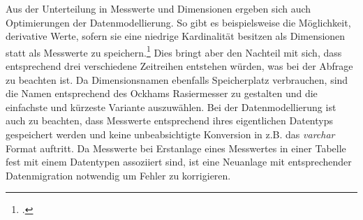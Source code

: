 Aus der Unterteilung in Messwerte und Dimensionen ergeben sich auch Optimierungen der Datenmodellierung. So gibt es beispielsweise die Möglichkeit, derivative Werte, sofern sie eine niedrige Kardinalität besitzen als Dimensionen statt als Messwerte zu speichern.\footcite[Vgl. auch im Folgenden][]{AmazonWebServicesInc..o.J.bt} Dies bringt aber den Nachteil mit sich, dass entsprechend drei verschiedene Zeitreihen entstehen würden, was bei der Abfrage zu beachten ist. Da Dimensionsnamen ebenfalls Speicherplatz verbrauchen, sind die Namen entsprechend des Ockhams Rasiermesser zu gestalten und die einfachste und kürzeste Variante auszuwählen. Bei der Datenmodellierung ist auch zu beachten, dass Messwerte entsprechend ihres eigentlichen Datentyps gespeichert werden und keine unbeabsichtigte Konversion in z.B. das \textit{varchar} Format auftritt. Da Messwerte bei Erstanlage eines Messwertes in einer Tabelle fest mit einem Datentypen assoziiert sind, ist eine Neuanlage mit entsprechender Datenmigration notwendig um Fehler zu korrigieren.




